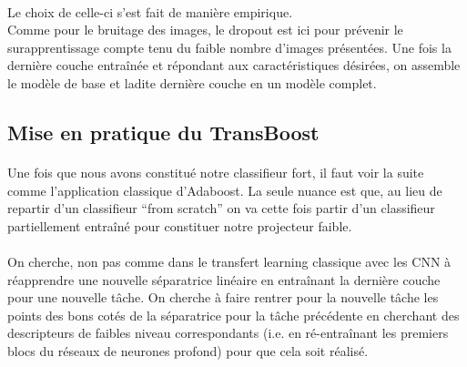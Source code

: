 \documentclass[11 pt]{article}
\begin{document}
\paragraph{}Le choix de celle-ci s’est fait de manière empirique.\\
Comme pour le bruitage des images, le dropout est ici pour prévenir le surapprentissage compte tenu du faible nombre d’images présentées.
Une fois la dernière couche entraînée et répondant aux caractéristiques désirées, on assemble le modèle de base et ladite dernière couche en un modèle complet.


\subsection{Mise en pratique du TransBoost}
\paragraph{}Une fois que nous avons constitué notre classifieur fort, il faut voir la suite comme l’application classique d’Adaboost. La seule nuance est que, au lieu de repartir d’un classifieur “from scratch” on va cette fois partir d’un classifieur partiellement entraîné pour constituer notre projecteur faible.

\paragraph{}On cherche, non pas comme dans le transfert learning classique avec les CNN à réapprendre une nouvelle séparatrice linéaire en entraînant la dernière couche pour une nouvelle tâche. On cherche à faire rentrer pour la nouvelle tâche les points des bons cotés de la séparatrice pour la tâche précédente en cherchant des descripteurs de faibles niveau correspondants (i.e. en ré-entraînant les premiers blocs du réseaux de neurones profond) pour que cela soit réalisé.
\end{document}
